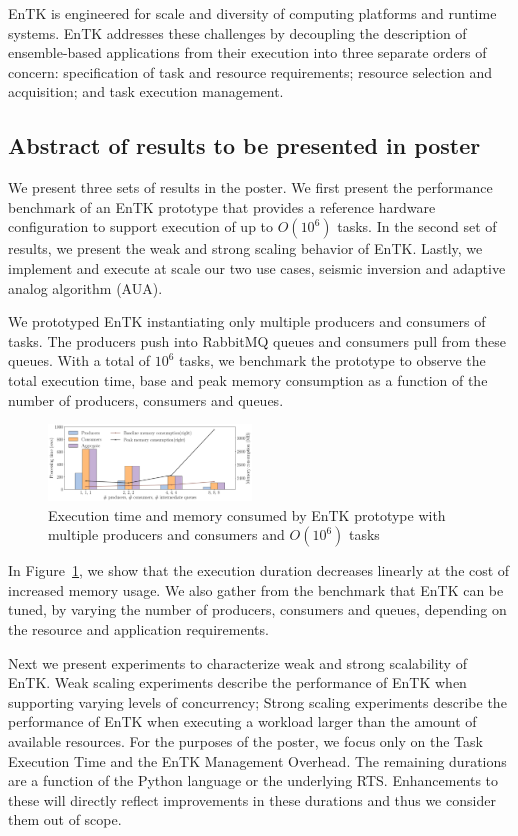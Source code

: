 EnTK is engineered for scale and diversity of computing platforms and runtime 
systems. EnTK addresses these challenges by decoupling the description of 
ensemble-based applications from their execution into three separate orders of 
concern: specification of task and resource requirements; resource selection and
acquisition; and task execution management.

\subsection{Abstract of results to be presented in poster}

We present three sets of results in the poster. We first present the performance
benchmark of an EnTK prototype that provides a reference hardware configuration 
to support execution of up to $O(10^6)$ tasks. In the second set of results, we
present the weak and strong scaling behavior of EnTK. Lastly, we implement and 
execute at scale our two use cases, seismic inversion and adaptive analog 
algorithm (AUA).

We prototyped EnTK instantiating only multiple producers and consumers of tasks.
The producers push into RabbitMQ queues and consumers pull from these queues.
With a total of $10^6$ tasks, we benchmark the prototype to observe the total
execution time, base and peak memory consumption as a function of the number of
producers, consumers and queues.

\begin{figure} 
\includegraphics[width=0.48\textwidth]{figs/prototype.pdf}
\caption{Execution time and memory consumed by EnTK prototype with multiple 
producers and consumers and $O(10^6)$ tasks}\label{fig:prototype}
\end{figure}

In Figure~\ref{fig:prototype}, we show that the execution duration decreases
linearly at the cost of increased memory usage. We also gather from the 
benchmark that EnTK can be tuned, by varying the number of producers, consumers 
and queues, depending on the resource and application requirements.


Next we present experiments to characterize weak and strong scalability of EnTK.
Weak scaling experiments describe the performance of EnTK when supporting 
varying levels of concurrency; Strong scaling experiments describe the 
performance of EnTK when executing a workload larger than the amount of 
available resources. For the purposes of the poster, we focus only on the Task
Execution Time and the EnTK Management Overhead. The remaining durations are
a function of the Python language or the underlying RTS. Enhancements to these
will directly reflect improvements in these durations and thus we consider them
out of scope.

